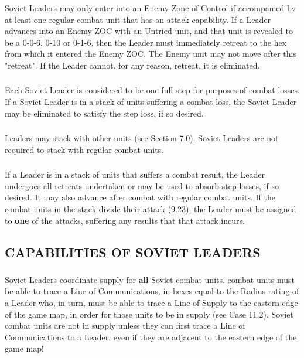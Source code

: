 \subsubsection{} Soviet Leaders may only enter into an Enemy Zone of Control if accompanied by at least one regular combat unit that has an attack capability. If a Leader advances into an Enemy ZOC with an Untried unit, and that unit is revealed to be a 0-0-6, 0-10 or 0-1-6, then the Leader must immediately retreat to the hex from which it entered the Enemy ZOC. The Enemy unit may not move after this "retreat". If the Leader cannot, for any reason, retreat, it is eliminated.

\subsubsection{} Each Soviet Leader is considered to be one full step for purposes of combat losses. If a Soviet Leader is in a stack of units suffering a combat loss, the Soviet Leader may be eliminated to satisfy the step loss, if so desired.

\subsubsection{} Leaders may stack with other units (see Section 7.0). Soviet Leaders are not required to stack with regular combat units.

\subsubsection{} If a Leader is in a stack of units that suffers a combat result, the Leader undergoes all retreats undertaken or may be used to absorb step losses, if so desired. It may also advance after combat with regular combat units. If the combat units in the stack divide their attack (9.23), the Leader must be assigned to \textbf{one} of the attacks, suffering any results that that attack incurs.

\begin{flushleft}
  \subsection{CAPABILITIES OF SOVIET LEADERS}
\end{flushleft}

\subsubsection{} Soviet Leaders coordinate supply for \textbf{all} Soviet combat units. combat units must be able to trace a Line of Communications, in hexes equal to the Radius rating of a Leader who, in turn, must be able to trace a Line of Supply to the eastern edge of the game map, in order for those units to be in supply (see Case 11.2). Soviet combat units are not in supply unless they can first trace a Line of Communications to a Leader, even if they are adjacent to the eastern edge of the game map!

